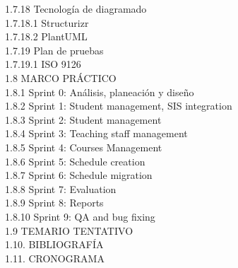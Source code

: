 1.7.18 Tecnología de diagramado\\
1.7.18.1 Structurizr\\
1.7.18.2 PlantUML\\
1.7.19 Plan de pruebas\\
1.7.19.1 ISO 9126\\
1.8 MARCO PRÁCTICO \\
1.8.1 Sprint 0: Análisis, planeación y diseño \\
1.8.2 Sprint 1: Student management, SIS integration \\
1.8.3 Sprint 2: Student management \\
1.8.4 Sprint 3: Teaching staff management \\
1.8.5 Sprint 4: Courses Management \\
1.8.6 Sprint 5: Schedule creation \\
1.8.7 Sprint 6: Schedule migration \\
1.8.8 Sprint 7: Evaluation \\
1.8.9 Sprint 8: Reports \\
1.8.10 Sprint 9: QA and bug fixing \\
1.9 TEMARIO TENTATIVO \\
1.10. BIBLIOGRAFÍA \\
1.11. CRONOGRAMA \\
